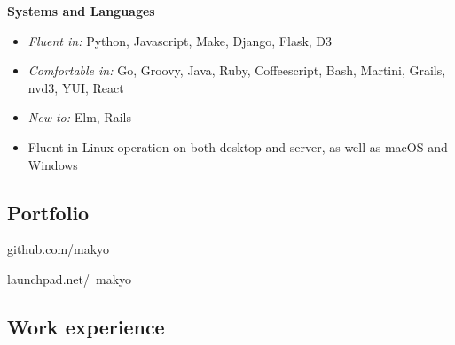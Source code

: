 \hspace{-1.5em}\textbf{Systems and Languages}

\begin{itemize}
  \item \textit{Fluent in:} Python, Javascript, Make, Django, Flask, D3
  \item \textit{Comfortable in:} Go, Groovy, Java, Ruby, Coffeescript, Bash, Martini, Grails, nvd3, YUI, React
  \item \textit{New to:} Elm, Rails
  \item Fluent in Linux operation on both desktop and server, as well as macOS and Windows
\end{itemize}

\subsection{Portfolio}

\noindent github.com/makyo

\noindent launchpad.net/~makyo

\newpage

\subsection{Work experience}

